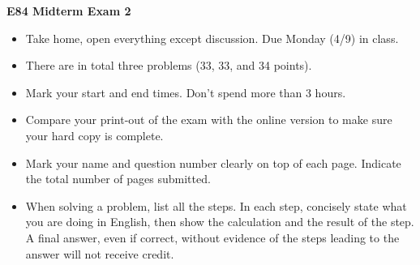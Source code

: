 \usepackage{html}

\begin{center}
{\Large \bf E84 Midterm Exam 2}
\end{center}

\begin{itemize}
\item Take home, open everything except discussion. Due Monday (4/9) in class.
\item There are in total three problems (33, 33, and 34 points).
\item Mark your start and end times. Don't spend more than 3 hours.
\item Compare your print-out of the exam with the online version to make sure 
  your hard copy is complete.
\item Mark your name and question number clearly on top of each page.
  Indicate the total number of pages submitted.
\item When solving a problem, list all the steps. In each step, concisely
  state what you are doing in English, then show the calculation and the 
  result of the step. A final answer, even if correct, without 
  evidence of the steps leading to the answer will not receive credit.
\end{itemize}

